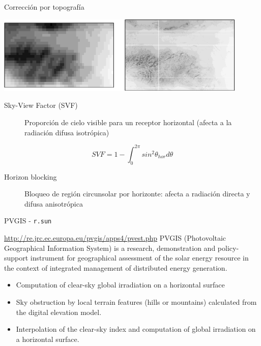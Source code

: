 \documentclass[xcolor={usenames,svgnames,dvipsnames}]{beamer}
\begin{document}
\begin{frame}[label={sec:orgd199967}]{Corrección por topografía}
\begin{center}
\begin{center}
\includegraphics[width=0.9\textwidth]{../figs/downscaling.pdf}
\end{center}
\end{center}

\begin{description}
\item[{Sky-View Factor (SVF)}] Proporción de cielo visible para un receptor horizontal (afecta a la radiación difusa isotrópica)
\end{description}
\[
SVF=1-\int_0^{2\pi}sin^{2} \theta_{hor} d\theta
\]

\begin{description}
\item[{Horizon blocking}] Bloqueo de región circunsolar por horizonte: afecta a radiación directa y difusa anisotrópica
\end{description}


\nocite{Bosch.Batlles.ea2010}
\nocite{Tovar-Pescador.Pozo-Vazquez.ea2006}
\nocite{Antonanzas-Torres.MartinezdePison.ea2013}
\nocite{Hofierka.Suri2002}
\end{frame}

\begin{frame}[fragile,label={sec:orge7aa9b3}]{PVGIS - \texttt{r.sun}}
 \begin{block}{\url{http://re.jrc.ec.europa.eu/pvgis/apps4/pvest.php}}
PVGIS (Photovoltaic Geographical Information System) is a research,
demonstration and policy-support instrument for geographical
assessment of the solar energy resource in the context of integrated
management of distributed energy generation.
\begin{itemize}
\item Computation of clear-sky global irradiation on a horizontal surface
\item Sky obstruction by local terrain features (hills or mountains)
calculated from the digital elevation model.
\item Interpolation of the clear-sky index and computation of global
irradiation on a horizontal surface.
\end{itemize}
\end{block}
\end{frame}
\end{document}
